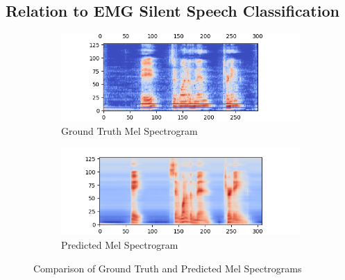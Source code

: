 \subsection{Relation to EMG Silent Speech Classification}

\begin{figure}
\centering
\begin{subfigure}{.5\textwidth}
    \centering
    \includegraphics[width=1\linewidth]{graphics/mel_vs_pred/458_g.png}
    \caption{Ground Truth Mel Spectrogram}
    \label{fig:sub1}
  \end{subfigure}%
  \begin{subfigure}{.5\textwidth}
    \centering
    \includegraphics[width=1\linewidth]{graphics/mel_vs_pred/458_p.png}
    \caption{Predicted Mel Spectrogram}
    \label{fig:sub2}
  \end{subfigure}
  \caption{Comparison of Ground Truth and Predicted Mel Spectrograms}
\end{figure}

